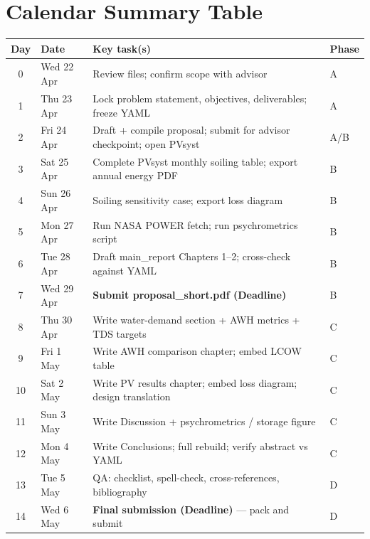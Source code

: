 \documentclass[11pt,a4paper]{article}
\begin{document}
\section{Calendar Summary Table}

\begin{center}
\small
\renewcommand{\arraystretch}{1.3}
\begin{longtable}{@{}clp{8cm}l@{}}
\toprule
\textbf{Day} & \textbf{Date} & \textbf{Key task(s)} & \textbf{Phase} \\
\midrule
\endhead
\rowcolor{rowA} 0 & Wed 22 Apr & Review files; confirm scope with advisor & A \\
\rowcolor{rowA} 1 & Thu 23 Apr & Lock problem statement, objectives, deliverables; freeze YAML & A \\
\rowcolor{rowA} 2 & Fri 24 Apr & Draft + compile proposal; submit for advisor checkpoint; open PVsyst & A/B \\
\rowcolor{rowB} 3 & Sat 25 Apr & Complete PVsyst monthly soiling table; export annual energy PDF & B \\
\rowcolor{rowB} 4 & Sun 26 Apr & Soiling sensitivity case; export loss diagram & B \\
\rowcolor{rowB} 5 & Mon 27 Apr & Run NASA POWER fetch; run psychrometrics script & B \\
\rowcolor{rowB} 6 & Tue 28 Apr & Draft main\_report Chapters 1--2; cross-check against YAML & B \\
\rowcolor{rowB} 7 & Wed 29 Apr & \textbf{Submit proposal\_short.pdf (Deadline)} & B \\
\rowcolor{rowC} 8 & Thu 30 Apr & Write water-demand section + AWH metrics + TDS targets & C \\
\rowcolor{rowC} 9 & Fri 1 May  & Write AWH comparison chapter; embed LCOW table & C \\
\rowcolor{rowC}10 & Sat 2 May  & Write PV results chapter; embed loss diagram; design translation & C \\
\rowcolor{rowC}11 & Sun 3 May  & Write Discussion + psychrometrics / storage figure & C \\
\rowcolor{rowC}12 & Mon 4 May  & Write Conclusions; full rebuild; verify abstract vs YAML & C \\
\rowcolor{rowD}13 & Tue 5 May  & QA: checklist, spell-check, cross-references, bibliography & D \\
\rowcolor{rowD}14 & Wed 6 May  & \textbf{Final submission (Deadline)} --- pack and submit & D \\
\bottomrule
\end{longtable}
\end{center}
\end{document}
